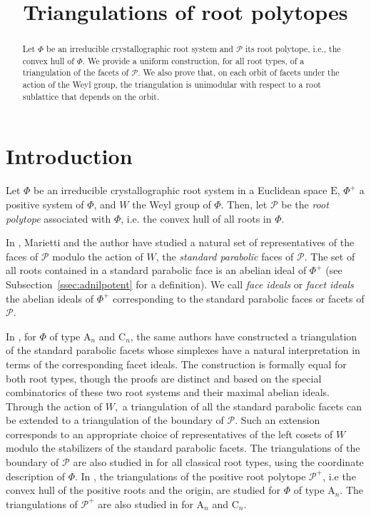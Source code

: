 \documentclass[ALCO,published]{cedram}
\title{Triangulations of root polytopes}
\author{\firstname{Paola} \lastname{Cellini}}
\newcommand\pol{\mathcal P}
\theoremstyle{plain}
\newcommand\pol{\mathcal P}
\begin{document}
\begin{abstract}
Let $\Phi$ be an irreducible crystallographic root system and $\pol$ its root polytope, i.e., the convex hull of $\Phi$. 
We provide a uniform construction, for all root types, of a triangulation of the facets of $\pol$. We also prove that, on each orbit of facets under the action of the Weyl group, the triangulation is unimodular  with respect to a root sublattice that depends on the orbit.
\end{abstract}

\maketitle


\section{Introduction}\label{sec:intro}

\par
Let $\Phi$ be an irreducible crystallographic root system in a Euclidean space $\mathrm E$, $\Phi^+$ a positive system of $\Phi$, and $W$ the Weyl group of $\Phi$. 
Then, let  $\pol$ be the {\it root polytope} associated with $\Phi$, i.e. the convex hull of all  roots in $\Phi$. 

\par 
In \cite{CM1}, Marietti and the author have studied a natural set of representatives of the faces of $\pol$ modulo the action of $W$, the {\it standard parabolic} faces of $\pol$.  
The set of all roots contained in a standard parabolic face is an abelian ideal of  $\Phi^+$ (see Subsection~\ref{ssec:adnilpotent} for a definition). 
We call {\it face ideals} or {\it facet ideals} the  abelian ideals of $\Phi^+$ corresponding to the standard parabolic faces or facets of $\pol$.

\par
In \cite{CM2}, for $\Phi$ of type $\mathrm A_n$ and $\mathrm C_n$,
the same authors have constructed a triangulation of the standard parabolic facets whose simplexes have a natural interpretation in terms of the corresponding facet ideals. 
The construction is formally equal for both root types, though the proofs are distinct and based on the special combinatorics of these two root systems and their maximal abelian ideals.  
Through the action of $W,$ a triangulation of all the standard parabolic facets can be extended to a triangulation of the boundary of $\pol$. 
Such an extension corresponds to an appropriate choice of representatives of the left cosets of $W$ modulo  the stabilizers of the standard parabolic facets.
The triangulations of the boundary of $\pol$ are also studied in  \cite{Ard} for all classical root types, using the coordinate description of $\Phi$.
In \cite{GGP}, the triangulations of the positive root polytope $\pol^+$, i.e the convex hull of the positive roots and the origin,  are studied for $\Phi$ of type $\mathrm A_n$.
The triangulations of $\pol^+$ are also studied in \cite{Mesz1, Mesz2} for $\mathrm A_n$ and $\mathrm C_n$.
\end{document}
